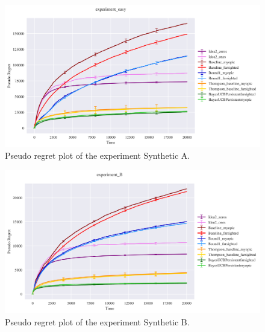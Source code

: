 \begin{figure}[H]
	\includegraphics[width=16cm]{./images/experiment_easy ANALYTICS.png}
	\centering	
	\caption{Pseudo regret plot of the experiment Synthetic A.}
\end{figure}
\begin{figure}[H]
	\includegraphics[width=16cm]{./images/experiment_B ANALYTICS.png}
	\centering	
	\caption{Pseudo regret plot of the experiment Synthetic B. }
\end{figure}

